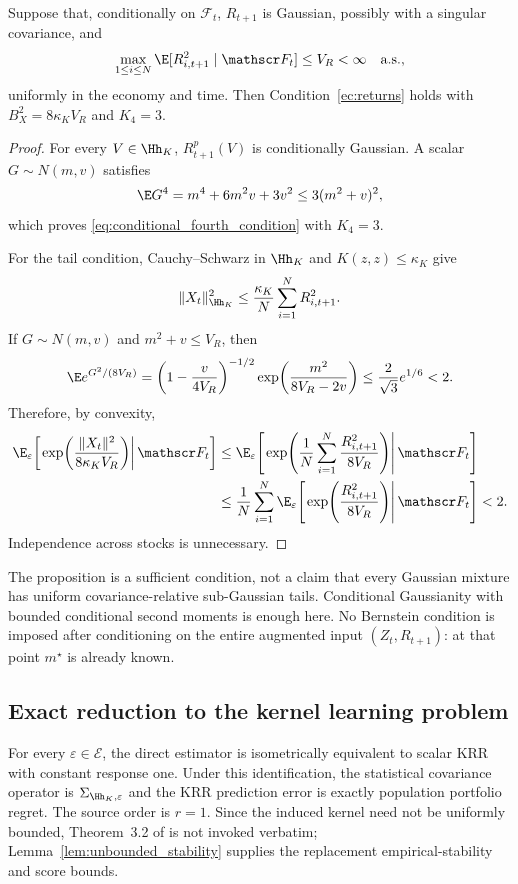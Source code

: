 \begin{proposition}
\label{prop:gaussian_admissible}
Suppose that, conditionally on $\mathscr F_t$, $R_{t+1}$ is Gaussian, possibly
with a singular covariance, and
\[
\max_{1\leq i\leq N}\E[R_{i,t+1}^2\mid\mathscr F_t]\leq V_R<\infty
\quad\text{a.s.},
\]
uniformly in the economy and time. Then Condition~\ref{ec:returns} holds
with $B_X^2=8\kappa_KV_R$ and $K_4=3$.
\end{proposition}
\begin{proof}
For every $V\in\Hh_K$, $R^p_{t+1}(V)$ is conditionally Gaussian. A scalar
$G\sim N(m,v)$ satisfies
\[
\E G^4=m^4+6m^2v+3v^2\leq3(m^2+v)^2,
\]
which proves \eqref{eq:conditional_fourth_condition} with $K_4=3$.

For the tail condition, Cauchy--Schwarz in $\Hh_K$ and
$K(z,z)\leq\kappa_K$ give
\[
\|X_t\|_{\Hh_K}^2
\leq
\frac{\kappa_K}{N}\sum_{i=1}^N R_{i,t+1}^2.
\]
If $G\sim N(m,v)$ and $m^2+v\leq V_R$, then
\[
\E e^{G^2/(8V_R)}
=\left(1-\frac{v}{4V_R}\right)^{-1/2}
  \exp\!\left(\frac{m^2}{8V_R-2v}\right)
\leq\frac{2}{\sqrt3}e^{1/6}<2.
\]
Therefore, by convexity,
\[
\begin{aligned}
\E_\varepsilon\!\left[
\left.
\exp\!\left(\frac{\|X_t\|^2}{8\kappa_KV_R}\right)
\right|\mathscr F_t
\right]
&\leq
\E_\varepsilon\!\left[
\left.
\exp\!\left(\frac1N\sum_{i=1}^N
              \frac{R_{i,t+1}^2}{8V_R}\right)
\right|\mathscr F_t
\right]\\
&\leq
\frac1N\sum_{i=1}^N
\E_\varepsilon\!\left[
\left.
\exp\!\left(\frac{R_{i,t+1}^2}{8V_R}\right)
\right|\mathscr F_t
\right]
<2.
\end{aligned}
\]
Independence across stocks is unnecessary.
\end{proof}

The proposition is a sufficient condition, not a claim that every Gaussian
mixture has uniform covariance-relative sub-Gaussian tails. Conditional
Gaussianity with bounded conditional second moments is enough here.
No Bernstein condition is imposed after conditioning on the entire
augmented input $(Z_t,R_{t+1})$: at that point $m^\star$ is already known.

\subsection{Exact reduction to the kernel learning problem}
\label{app:induced_krr}

\begin{lemma}
\label{lem:induced_krr}
For every $\varepsilon\in\mathcal E$, the direct estimator is isometrically
equivalent to scalar KRR with constant response one. Under this identification,
the statistical covariance operator is $\Sigma_{\Hh_K,\varepsilon}$ and
the KRR prediction error is exactly population portfolio regret. The source
order is $r=1$. Since the induced kernel need not be uniformly bounded,
Theorem~3.2 of \citet{bignozzigagliardinischneider2026} is not invoked
verbatim; Lemma~\ref{lem:unbounded_stability} supplies the replacement
empirical-stability and score bounds.
\end{lemma}

